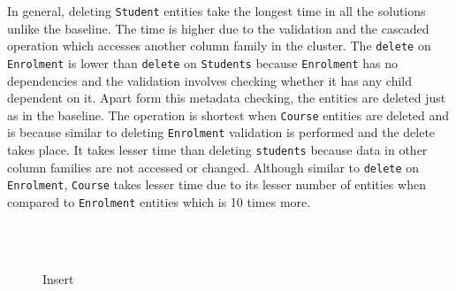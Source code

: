In general, deleting \texttt{Student} entities take the longest time in all the
solutions unlike the baseline. The time is higher due to the validation and the
cascaded operation which accesses another column family in the cluster. The
\texttt{delete} on \texttt{Enrolment} is lower than \texttt{delete} on
\texttt{Students} because \texttt{Enrolment} has no dependencies and the
validation involves checking whether it has any child dependent on it. Apart
form this metadata checking, the entities are deleted just as in the baseline.
The operation is shortest when \texttt{Course} entities are deleted and is
because similar to deleting \texttt{Enrolment} validation is performed and the
delete takes place. It takes lesser time than deleting \texttt{students} because
data in other column families are not accessed or changed. Although similar to
\texttt{delete} on \texttt{Enrolment}, \texttt{Course} takes lesser time due to
its lesser number of entities when compared to \texttt{Enrolment} entities which
is 10 times more.



% 	

\begin{figure}
	\centering
	\\
	\\
\end{figure}


\renewcommand{\Width}{.6\textwidth}
\begin{figure}
	\centering
	\caption{Insert}
\end{figure}


